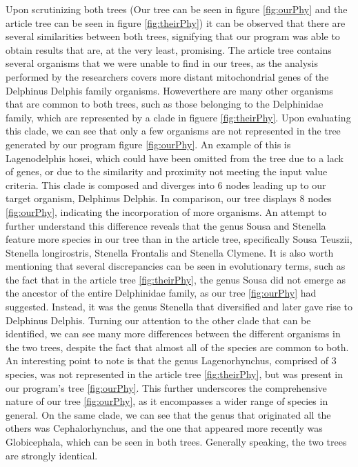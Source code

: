 \documentclass[12pt]{article}
\begin{document}
Upon scrutinizing both trees (Our tree can be seen in figure \ref{fig:ourPhy} and the article tree can be seen in figure \ref{fig:theirPhy}) it can be observed that there are several similarities between both trees, signifying that our program was able to obtain results that are, at the very least, promising. The article tree contains several organisms that we were unable to find in our trees, as the analysis performed by the researchers covers more distant mitochondrial genes of the Delphinus Delphis family organisms. Howeverthere are many other organisms that are common to both trees, such as those belonging to the Delphinidae family, which are represented by a clade in figuere \ref{fig:theirPhy}. Upon evaluating this clade, we can see that only a few organisms are not represented in the tree generated by our program figure \ref{fig:ourPhy}. An example of this is Lagenodelphis hosei, which could have been omitted from the tree due to a lack of genes, or due to the similarity and proximity not meeting the input value criteria. This clade is composed and diverges into 6 nodes leading up to our target organism, Delphinus Delphis. In comparison, our tree displays 8 nodes \ref{fig:ourPhy}, indicating the incorporation of more organisms. An attempt to further understand this difference reveals that the genus Sousa and Stenella feature more species in our tree than in the article tree, specifically Sousa Teuszii, Stenella longirostris, Stenella Frontalis and Stenella Clymene.\newline
It is also worth mentioning that several discrepancies can be seen in evolutionary terms, such as the fact that in the article tree \ref{fig:theirPhy}, the genus Sousa did not emerge as the ancestor of the entire Delphinidae family, as our tree \ref{fig:ourPhy} had suggested. Instead, it was the genus Stenella that diversified and later gave rise to Delphinus Delphis.\newline
Turning our attention to the other clade that can be identified, we can see many more differences between the different organisms in the two trees, despite the fact that almost all of the species are common to both. An interesting point to note is that the genus Lagenorhynchus, comprised of 3 species, was not represented in the article tree \ref{fig:theirPhy}, but was present in our program's tree \ref{fig:ourPhy}. This further underscores the comprehensive nature of our tree \ref{fig:ourPhy}, as it encompasses a wider range of species in general.\newline
On the same clade, we can see that the genus that originated all the others was Cephalorhynchus, and the one that appeared more recently was Globicephala, which can be seen in both trees. Generally speaking, the two trees are strongly identical. \newline
\end{document}
